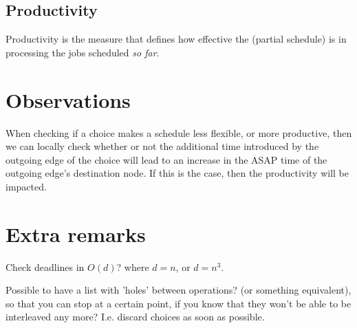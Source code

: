 \documentclass[]{article}
\begin{document}
\subsection{Productivity}
Productivity is the measure that defines how effective the (partial schedule) is in processing the jobs scheduled \textit{so far}.

\section{Observations}
When checking if a choice makes a schedule less flexible, or more productive, then we can locally check whether or not the additional time introduced by the outgoing edge of the choice will lead to an increase in the ASAP time of the outgoing edge's destination node. If this is the case, then the productivity will be impacted.

\section{Extra remarks}
Check deadlines in $O(d)$? where $d = n$, or $d = n^3$. 

Possible to have a list with 'holes' between operations? (or something equivalent), so that you can stop at a certain point, if you know that they won't be able to be interleaved any more? I.e. discard choices as soon as possible.
\end{document}
